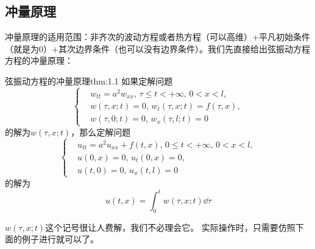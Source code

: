 \subsection{冲量原理}
冲量原理的适用范围：非齐次的波动方程或者热方程（可以高维）+平凡初始条件（就是为0）+其次边界条件（也可以没有边界条件）。我们先直接给出弦振动方程方程的冲量原理：
\begin{theorem}{弦振动方程的冲量原理}{thm:1.1}
    如果定解问题
    \begin{equation*}
        \left\{
            \begin{aligned}
                &w_{tt} = a^2 w_{xx} ,\, \tau \leq t < +\infty,\, 0< x < l,\\
                &w(\tau, x; t) = 0,\, w_t(\tau, x; t) =  f(\tau, x),\\
                &w(\tau, 0; t) = 0,\, w_x(\tau, l; t) = 0
            \end{aligned}
        \right.
    \end{equation*}
    的解为$w(\tau, x; t)$，那么定解问题
    \begin{equation*}
        \left\{
            \begin{aligned}
                &u_{tt} = a^2 u_{xx} + f(t, x),\, 0 \leq t < +\infty,\, 0< x < l,\\
                &u(0, x) = 0,\, u_t(0, x) = 0,\\
                &u(t, 0) = 0,\, u_x(t, l) = 0
            \end{aligned}
        \right.
    \end{equation*}
    的解为
    \[u(t, x) = \int_{0}^{t} w(\tau, x; t) \dd{\tau}\]
\end{theorem}
$w(\tau, x; t)$这个记号很让人费解，我们不必理会它。
实际操作时，只需要仿照下面的例子进行就可以了。
